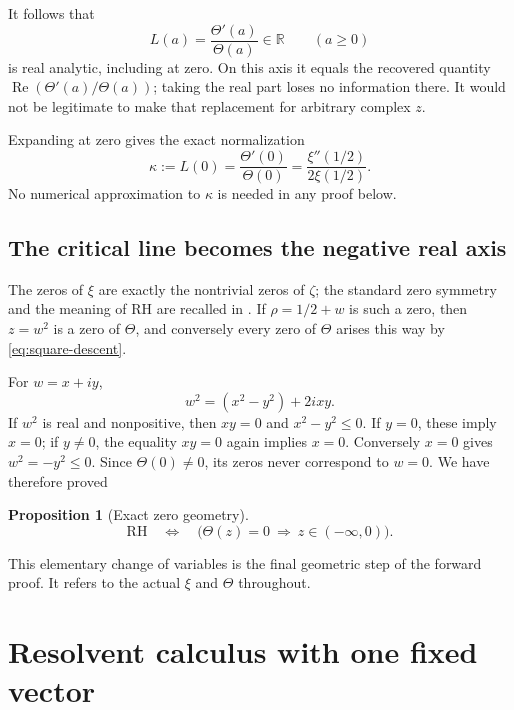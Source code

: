 \documentclass[11pt,a4paper]{article}
\numberwithin{equation}{section}
\newtheorem{proposition}[theorem]{Proposition}
\theoremstyle{definition}
\theoremstyle{remark}
\newcommand{\R}{\mathbb R}
\newcommand{\RH}{\mathrm{RH}}
\DeclareMathOperator{\Repart}{Re}
\begin{document}
It follows that
\begin{equation}\label{eq:L}
L(a)=\frac{\Theta'(a)}{\Theta(a)}\in\R\qquad(a\geq0)
\end{equation}
is real analytic, including at zero. On this axis it equals the recovered
quantity $\Repart(\Theta'(a)/\Theta(a))$; taking the real part loses no
information there. It would not be legitimate to make that replacement
for arbitrary complex $z$.

Expanding at zero gives the exact normalization
\begin{equation}\label{eq:kappa}
\kappa:=L(0)=\frac{\Theta'(0)}{\Theta(0)}
=\frac{\xi''(1/2)}{2\xi(1/2)}.
\end{equation}
No numerical approximation to $\kappa$ is needed in any proof below.

\subsection{The critical line becomes the negative real axis}

The zeros of $\xi$ are exactly the nontrivial zeros of $\zeta$; the
standard zero symmetry and the meaning of RH are recalled in
\cite{dlmf-zeros}. If $\rho=1/2+w$ is such a zero, then
$z=w^2$ is a zero of $\Theta$, and conversely every zero of $\Theta$
arises this way by \eqref{eq:square-descent}.

For $w=x+iy$,
\begin{equation}\label{eq:square-real}
w^2=(x^2-y^2)+2ixy.
\end{equation}
If $w^2$ is real and nonpositive, then $xy=0$ and $x^2-y^2\leq0$.
If $y=0$, these imply $x=0$; if $y\ne0$, the equality $xy=0$ again
implies $x=0$. Conversely $x=0$ gives $w^2=-y^2\leq0$.
Since $\Theta(0)\ne0$, its zeros never correspond to $w=0$.
We have therefore proved
\begin{proposition}[Exact zero geometry]\label{prop:geometry}
\begin{equation}\label{eq:rh-geometry}
\RH\quad\Longleftrightarrow\quad
\bigl(\Theta(z)=0\ \Longrightarrow\ z\in(-\infty,0)\bigr).
\end{equation}
\end{proposition}
This elementary change of variables is the final geometric step of the
forward proof. It refers to the actual $\xi$ and $\Theta$ throughout.

\section[Fixed-vector resolvent calculus]{Resolvent calculus with one fixed vector}\label{sec:resolvent}
\end{document}
